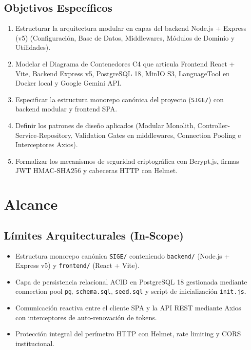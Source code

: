 \documentclass[11pt,a4paper]{article}
\begin{document}
\subsection{Objetivos Específicos}
\begin{enumerate}[leftmargin=1.5em, itemsep=2pt, topsep=2pt]
    \item Estructurar la arquitectura modular en capas del backend Node.js + Express (v5) (Configuración, Base de Datos, Middlewares, Módulos de Dominio y Utilidades).
    \item Modelar el Diagrama de Contenedores C4 que articula Frontend React + Vite, Backend Express v5, PostgreSQL 18, MinIO S3, LanguageTool en Docker local y Google Gemini API.
    \item Especificar la estructura monorepo canónica del proyecto (\texttt{SIGE/}) con backend modular y frontend SPA.
    \item Definir los patrones de diseño aplicados (Modular Monolith, Controller-Service-Repository, Validation Gates en middlewares, Connection Pooling e Interceptores Axios).
    \item Formalizar los mecanismos de seguridad criptográfica con Bcrypt.js, firmas JWT HMAC-SHA256 y cabeceras HTTP con Helmet.
\end{enumerate}

\section{Alcance}

\subsection{Límites Arquitecturales (In-Scope)}
\begin{itemize}[leftmargin=1.5em, itemsep=2pt]
    \item Estructura monorepo canónica \texttt{SIGE/} conteniendo \texttt{backend/} (Node.js + Express v5) y \texttt{frontend/} (React + Vite).
    \item Capa de persistencia relacional ACID en PostgreSQL 18 gestionada mediante connection pool \texttt{pg}, \texttt{schema.sql}, \texttt{seed.sql} y script de inicialización \texttt{init.js}.
    \item Comunicación reactiva entre el cliente SPA y la API REST mediante Axios con interceptores de auto-renovación de tokens.
    \item Protección integral del perímetro HTTP con Helmet, rate limiting y CORS institucional.
\end{itemize}
\end{document}
